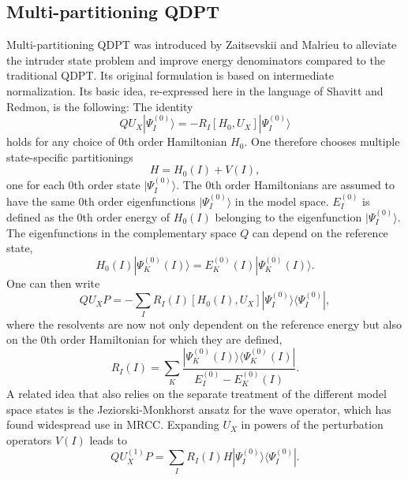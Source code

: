 \subsection{Multi-partitioning QDPT}
Multi-partitioning QDPT\cite{ZaitsM_1995_597} was introduced by Zaitsevskii and Malrieu to alleviate the intruder state problem and improve energy denominators compared to the traditional QDPT. Its original formulation is based on intermediate normalization.\cite{ZaitsM_1995_597} Its basic idea, re-expressed here in the language of Shavitt and Redmon,\cite{ShaviR_1980_5711} is the following: The identity
	\begin{equation}
	Q{U_X}|\Psi _I^{(0)}\rangle  =  - {R_I}[{H_0},{U_X}]|\Psi _I^{(0)}\rangle 
	\end{equation} 	
holds for any choice of 0th order Hamiltonian ${H_0}$. One therefore chooses multiple state-specific partitionings
	\begin{equation}
	H = {H_0}(I) + V(I),
	\end{equation} 	
one for each 0th order state $|\Psi _I^{(0)}\rangle $. The 0th order Hamiltonians are assumed to have the same 0th order eigenfunctions $|\Psi_I^{(0)}\rangle$ in the model space. $E_I^{(0)}$ is defined as the 0th order energy of $H_0(I)$ belonging to the eigenfunction $|\Psi_I^{(0)}\rangle$. The eigenfunctions in the complementary space $Q$ can depend on the reference state,
\begin{equation}
H_0(I)|\Psi_K^{(0)}(I)\rangle = E_K^{(0)}(I)|\Psi_K^{(0)}(I)\rangle.
\end{equation}
One can then write
	\begin{equation}
	\label{Eq:QUXP_resolvent}
	Q{U_X}P =  - \sum\limits_I {{R_I}} (I)[{H_0}(I),{U_X}]|\Psi _I^{(0)}\rangle \langle \Psi _I^{(0)}|,
	\end{equation} 	
where the resolvents are now not only dependent on the reference energy but also on the 0th order Hamiltonian for which they are defined,
	\begin{equation}
	\label{Eq:statespecific_resolvents}
	{R_I}(I) = \sum\limits_K {\frac{{|\Psi _K^{(0)}(I)\rangle \langle \Psi _K^{(0)}(I)|}}{{E_I^{(0)} - E_K^{(0)}(I)}}}. 
	\end{equation}
A related idea that also relies on the separate treatment of the different model space states is the Jeziorski-Monkhorst ansatz for the wave operator,\cite{JezioM_1981_1668} which has found widespread use in MRCC.	
Expanding $U_X$ in powers of the perturbation operators $V(I)$ leads to
	\begin{equation}
	QU_X^{(1)}P = \sum\limits_I {{R_I}} (I)H|\Psi _I^{(0)}\rangle \langle \Psi _I^{(0)}|.
	\end{equation} 	
